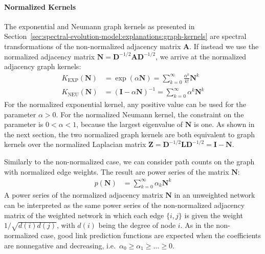 \documentclass[11pt,a4paper]{book}
\begin{document}
\paragraph{Normalized Kernels}
The exponential and Neumann graph kernels as presented in
Section~\ref{sec:spectral-evolution-model:explanations:graph-kernels}
are spectral transformations of the non-normalized 
adjacency matrix $\mathbf A$.  If instead we use the normalized
adjacency matrix $\mathbf N = \mathbf D^{-1/2} \mathbf A \mathbf
D^{-1/2}$, we arrive at the normalized adjacency graph kernels:
\begin{align}
  K_{\mathrm{EXP}}(\mathbf N) &= \exp(\alpha \mathbf N) 
  = \sum_{k=0}^\infty \frac {\alpha^k}{k!} \mathbf
  N^k \label{eq:normalized-matrix-exponential} \\ 
  K_{\mathrm{NEU}}(\mathbf N) &= (\mathbf I - \alpha \mathbf N)^{-1} 
  = \sum_{k=0}^\infty \alpha^k \mathbf N^k \label{eq:normalized-neumann-kernel}
\end{align}
For the normalized exponential kernel, any positive value can be
used for the parameter $\alpha>0$. 
For the normalized Neumann kernel, the constraint on the parameter
is $0 < \alpha < 1$, because the largest eigenvalue of $\mathbf N$ is
one.  As shown in the next section, the two normalized graph kernels are
both equivalent to graph kernels over the normalized Laplacian matrix
$\mathbf Z = \mathbf D^{-1/2}\mathbf L\mathbf D^{-1/2} = \mathbf I -
\mathbf N$. 

Similarly to the non-normalized case, we can consider path counts on the
graph with normalized edge weights.  The result are power series of the
matrix $\mathbf N$:
\begin{align}
  p(\mathbf N) &= \sum_{k=0}^\infty \alpha_k \mathbf N^k 
  \label{eq:normalized-path-counting} 
\end{align}
A power series of the normalized adjacency matrix $\mathbf N$ in an
unweighted network can be interpreted as the same power series of the
non-normalized adjacency matrix of the weighted network in which each
edge $\{i,j\}$ is given the weight $1/\sqrt{d(i)d(j)}$, with $d(i)$
being the degree of node $i$. 
As in the non-normalized case, good link prediction functions are
expected when the coefficients are
nonnegative and decreasing, i.e.\ $\alpha_0 \geq \alpha_1 \geq \ldots
\geq 0$.  
\end{document}
